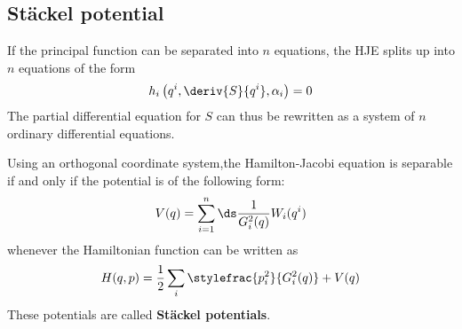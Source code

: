 \subsection{St\"ackel potential}
	
	\begin{remark}
		If the principal function can be separated into $n$ equations, the HJE splits up into $n$ equations of the form
		\begin{equation}
			h_i\left(q^i, \deriv{S}{q^i}, \alpha_i\right) = 0
		\end{equation}
		The partial differential equation for $S$ can thus be rewritten as a system of $n$ ordinary differential equations.
	\end{remark}

	\begin{theorem}
		Using an orthogonal coordinate system,\newline the Hamilton-Jacobi equation is separable if and only if the potential is of the following form:
		\begin{equation}
			\label{lagrange:stackel_condition}
			V(q) = \sum_{i=1}^n\ds\frac{1}{G_i^2(q)}W_i(q^i)
		\end{equation}
		whenever the Hamiltonian function can be written as
		\begin{equation}
			H(q, p) = \frac{1}{2}\sum_i\stylefrac{p_i^2}{G^2_i(q)} + V(q)
		\end{equation}
		These potentials are called \textbf{St\"ackel potentials}.
	\end{theorem}
